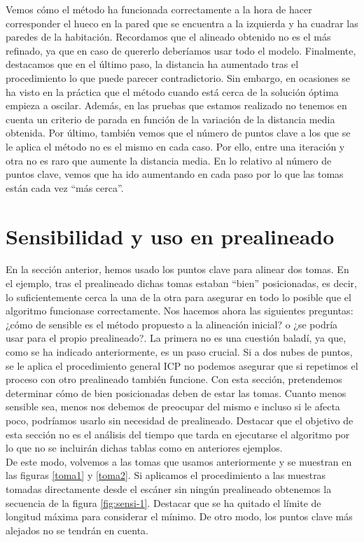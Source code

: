 Vemos cómo el método ha funcionada correctamente a la hora de hacer corresponder el hueco en la pared que se encuentra a la izquierda y ha cuadrar las paredes de la habitación. Recordamos que el alineado obtenido no es el más refinado, ya que en caso de quererlo deberíamos usar todo el modelo. Finalmente, destacamos que en el último paso, la distancia ha aumentado tras el procedimiento lo que puede parecer contradictorio. Sin embargo, en ocasiones se ha visto en la práctica que el método cuando está cerca de la solución óptima empieza a oscilar. Además,  en las pruebas que estamos realizado no tenemos en cuenta un criterio de parada en función de la variación de la distancia media obtenida. Por último, también vemos que el número de puntos clave a los que se le aplica el método no es el mismo en cada caso. Por ello, entre una iteración y otra no es raro que aumente la distancia media. En lo relativo al número de puntos clave, vemos que ha ido aumentando en cada paso por lo que las tomas están cada vez ``más cerca''.

\section{Sensibilidad y uso en prealineado}
En la sección anterior, hemos usado los puntos clave para alinear dos tomas. En el ejemplo, tras el prealineado dichas tomas estaban ``bien'' posicionadas, es decir, lo suficientemente cerca la una de la otra para asegurar en todo lo posible que el algoritmo funcionase correctamente. Nos hacemos ahora las siguientes preguntas: ¿cómo de sensible es el método propuesto a la alineación inicial? o ¿se podría usar para el propio prealineado?. La primera no es una cuestión baladí, ya que, como se ha indicado anteriormente, es un paso crucial. Si a dos nubes de puntos, se le aplica el procedimiento general ICP no podemos asegurar que si repetimos el proceso con otro prealineado  también funcione. Con esta sección, pretendemos determinar cómo de bien posicionadas deben de estar las tomas. Cuanto menos sensible sea, menos nos debemos de preocupar del mismo e incluso si le afecta poco, podríamos usarlo sin necesidad de prealineado. Destacar que el objetivo de esta sección no es el análisis del tiempo que tarda en ejecutarse el algoritmo por lo que no se incluirán dichas tablas como en anteriores ejemplos.\\

De este modo, volvemos a las tomas que usamos anteriormente y se muestran en las figuras \ref{toma1} y \ref{toma2}. Si aplicamos el procedimiento a las muestras tomadas directamente desde el escáner sin ningún prealineado obtenemos la secuencia de la figura \ref{fig:sensi-1}. Destacar que se ha quitado el límite de longitud máxima para considerar el mínimo. De otro modo, los puntos clave más alejados no se tendrán en cuenta. \\


